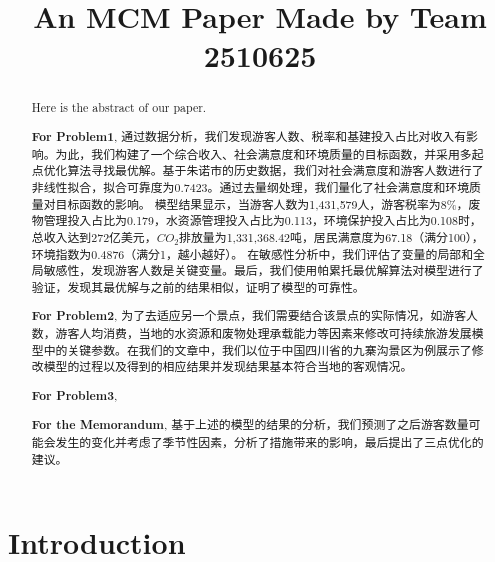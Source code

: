 \documentclass[12pt]{article}  %
\title{An MCM Paper Made by Team 2510625}  %
\begin{document}
\begin{abstract}
    Here is the abstract of our paper.

    \textbf{For Problem1}, 通过数据分析，我们发现游客人数、税率和基建投入占比对收入有影响。为此，我们构建了一个综合收入、社会满意度和环境质量的目标函数，并采用多起点优化算法寻找最优解。基于朱诺市的历史数据，我们对社会满意度和游客人数进行了非线性拟合，拟合可靠度为0.7423。通过去量纲处理，我们量化了社会满意度和环境质量对目标函数的影响。
	模型结果显示，当游客人数为1,431,579人，游客税率为8\%，废物管理投入占比为0.179，水资源管理投入占比为0.113，环境保护投入占比为0.108时，总收入达到272亿美元，$CO_2$排放量为1,331,368.42吨，居民满意度为67.18（满分100），环境指数为0.4876（满分1，越小越好）。
	在敏感性分析中，我们评估了变量的局部和全局敏感性，发现游客人数是关键变量。最后，我们使用帕累托最优解算法对模型进行了验证，发现其最优解与之前的结果相似，证明了模型的可靠性。

    \textbf{For Problem2}, 为了去适应另一个景点，我们需要结合该景点的实际情况，如游客人数，游客人均消费，当地的水资源和废物处理承载能力等因素来修改可持续旅游发展模型中的关键参数。在我们的文章中，我们以位于中国四川省的九寨沟景区为例展示了修改模型的过程以及得到的相应结果并发现结果基本符合当地的客观情况。

    \textbf{For Problem3}, 

	\textbf{For the Memorandum}, 基于上述的模型的结果的分析，我们预测了之后游客数量可能会发生的变化并考虑了季节性因素，分析了措施带来的影响，最后提出了三点优化的建议。

\end{abstract}

\maketitle  %
\tableofcontents  %


\section{Introduction}
\end{document}
